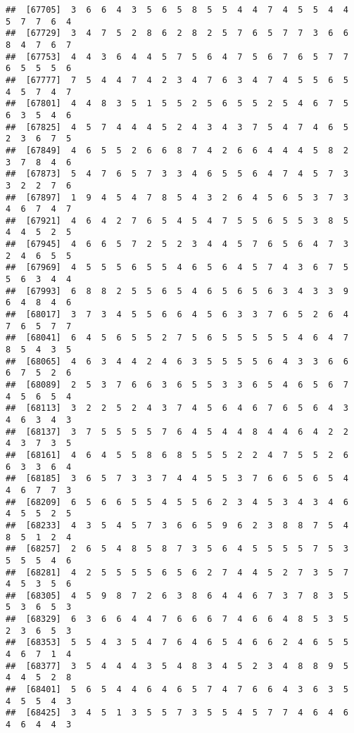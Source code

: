 \documentclass[
]{book}
\begin{document}
\begin{verbatim}
##  [67705]  3  6  6  4  3  5  6  5  8  5  5  4  4  7  4  5  5  4  4  5  7  7  6  4
##  [67729]  3  4  7  5  2  8  6  2  8  2  5  7  6  5  7  7  3  6  6  8  4  7  6  7
##  [67753]  4  4  3  6  4  4  5  7  5  6  4  7  5  6  7  6  5  7  7  6  5  5  5  6
##  [67777]  7  5  4  4  7  4  2  3  4  7  6  3  4  7  4  5  5  6  5  4  5  7  4  7
##  [67801]  4  4  8  3  5  1  5  5  2  5  6  5  5  2  5  4  6  7  5  6  3  5  4  6
##  [67825]  4  5  7  4  4  4  5  2  4  3  4  3  7  5  4  7  4  6  5  2  3  6  7  5
##  [67849]  4  6  5  5  2  6  6  8  7  4  2  6  6  4  4  4  5  8  2  3  7  8  4  6
##  [67873]  5  4  7  6  5  7  3  3  4  6  5  5  6  4  7  4  5  7  3  3  2  2  7  6
##  [67897]  1  9  4  5  4  7  8  5  4  3  2  6  4  5  6  5  3  7  3  4  6  7  4  7
##  [67921]  4  6  4  2  7  6  5  4  5  4  7  5  5  6  5  5  3  8  5  4  4  5  2  5
##  [67945]  4  6  6  5  7  2  5  2  3  4  4  5  7  6  5  6  4  7  3  2  4  6  5  5
##  [67969]  4  5  5  5  6  5  5  4  6  5  6  4  5  7  4  3  6  7  5  5  6  3  4  4
##  [67993]  6  8  8  2  5  5  6  5  4  6  5  6  5  6  3  4  3  3  9  6  4  8  4  6
##  [68017]  3  7  3  4  5  5  6  6  4  5  6  3  3  7  6  5  2  6  4  7  6  5  7  7
##  [68041]  6  4  5  6  5  5  2  7  5  6  5  5  5  5  5  4  6  4  7  8  5  4  3  5
##  [68065]  4  6  3  4  4  2  4  6  3  5  5  5  5  6  4  3  3  6  6  6  7  5  2  6
##  [68089]  2  5  3  7  6  6  3  6  5  5  3  3  6  5  4  6  5  6  7  4  5  6  5  4
##  [68113]  3  2  2  5  2  4  3  7  4  5  6  4  6  7  6  5  6  4  3  4  6  3  4  3
##  [68137]  3  7  5  5  5  5  7  6  4  5  4  4  8  4  4  6  4  2  2  4  3  7  3  5
##  [68161]  4  6  4  5  5  8  6  8  5  5  5  2  2  4  7  5  5  2  6  6  3  3  6  4
##  [68185]  3  6  5  7  3  3  7  4  4  5  5  3  7  6  6  5  6  5  4  4  6  7  7  3
##  [68209]  6  5  6  6  5  5  4  5  5  6  2  3  4  5  3  4  3  4  6  4  5  5  2  5
##  [68233]  4  3  5  4  5  7  3  6  6  5  9  6  2  3  8  8  7  5  4  8  5  1  2  4
##  [68257]  2  6  5  4  8  5  8  7  3  5  6  4  5  5  5  5  7  5  3  5  5  5  4  6
##  [68281]  4  2  5  5  5  5  6  5  6  2  7  4  4  5  2  7  3  5  7  4  5  3  5  6
##  [68305]  4  5  9  8  7  2  6  3  8  6  4  4  6  7  3  7  8  3  5  5  3  6  5  3
##  [68329]  6  3  6  6  4  4  7  6  6  6  7  4  6  6  4  8  5  3  5  2  3  6  5  3
##  [68353]  5  5  4  3  5  4  7  6  4  6  5  4  6  6  2  4  6  5  5  4  6  7  1  4
##  [68377]  3  5  4  4  4  3  5  4  8  3  4  5  2  3  4  8  8  9  5  4  4  5  2  8
##  [68401]  5  6  5  4  4  6  4  6  5  7  4  7  6  6  4  3  6  3  5  4  5  5  4  3
##  [68425]  3  4  5  1  3  5  5  7  3  5  5  4  5  7  7  4  6  4  6  4  6  4  4  3

\end{verbatim}
\end{document}
